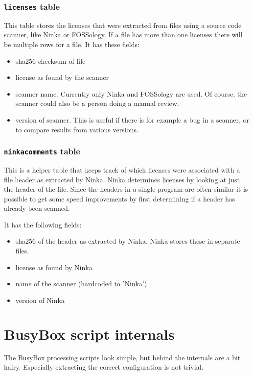 \documentclass[10pt]{article}
\begin{document}
\subsubsection{\texttt{licenses} table}

This table stores the licenses that were extracted from files using a source
code scanner, like Ninka or FOSSology. If a file has more than one licenses
there will be multiple rows for a file. It has these fields:

\begin{itemize}
\item sha256 checksum of file
\item license as found by the scanner
\item scanner name. Currently only Ninka and FOSSology are used. Of course, the
scanner could also be a person doing a manual review.
\item version of scanner. This is useful if there is for example a bug in a
scanner, or to compare results from various versions.
\end{itemize}

\subsubsection{\texttt{ninkacomments} table}

This is a helper table that keeps track of which licenses were associated with
a file header as extracted by Ninka. Ninka determines licenses by looking at
just the header of the file. Since the headers in a single program are often
similar it is possible to get some speed improvements by first determining if a
header has already been scanned.

It has the following fields:

\begin{itemize}
\item sha256 of the header as extracted by Ninka. Ninka stores these in
separate files.
\item license as found by Ninka
\item name of the scanner (hardcoded to 'Ninka')
\item version of Ninka
\end{itemize}

\section{BusyBox script internals}

The BusyBox processing scripts look simple, but behind the internals are a bit
hairy. Especially extracting the correct configuration is not trivial.
\end{document}

